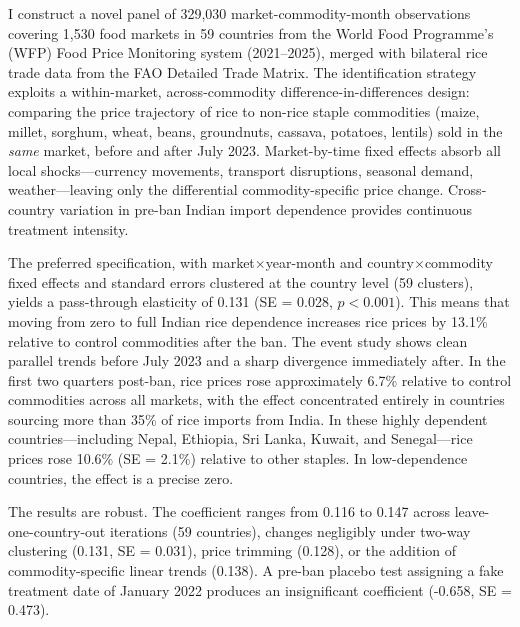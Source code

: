\documentclass[12pt]{article}
\begin{document}
I construct a novel panel of 329,030 market-commodity-month observations covering 1,530 food markets in 59 countries from the World Food Programme's (WFP) Food Price Monitoring system (2021--2025), merged with bilateral rice trade data from the FAO Detailed Trade Matrix. The identification strategy exploits a within-market, across-commodity difference-in-differences design: comparing the price trajectory of rice to non-rice staple commodities (maize, millet, sorghum, wheat, beans, groundnuts, cassava, potatoes, lentils) sold in the \textit{same} market, before and after July 2023. Market-by-time fixed effects absorb all local shocks---currency movements, transport disruptions, seasonal demand, weather---leaving only the differential commodity-specific price change. Cross-country variation in pre-ban Indian import dependence provides continuous treatment intensity.

The preferred specification, with market$\times$year-month and country$\times$commodity fixed effects and standard errors clustered at the country level (59 clusters), yields a pass-through elasticity of 0.131 (SE = 0.028, $p < 0.001$). This means that moving from zero to full Indian rice dependence increases rice prices by 13.1\% relative to control commodities after the ban. The event study shows clean parallel trends before July 2023 and a sharp divergence immediately after. In the first two quarters post-ban, rice prices rose approximately 6.7\% relative to control commodities across all markets, with the effect concentrated entirely in countries sourcing more than 35\% of rice imports from India. In these highly dependent countries---including Nepal, Ethiopia, Sri Lanka, Kuwait, and Senegal---rice prices rose 10.6\% (SE = 2.1\%) relative to other staples. In low-dependence countries, the effect is a precise zero.

The results are robust. The coefficient ranges from 0.116 to 0.147 across leave-one-country-out iterations (59 countries), changes negligibly under two-way clustering (0.131, SE = 0.031), price trimming (0.128), or the addition of commodity-specific linear trends (0.138). A pre-ban placebo test assigning a fake treatment date of January 2022 produces an insignificant coefficient (-0.658, SE = 0.473).
\end{document}
